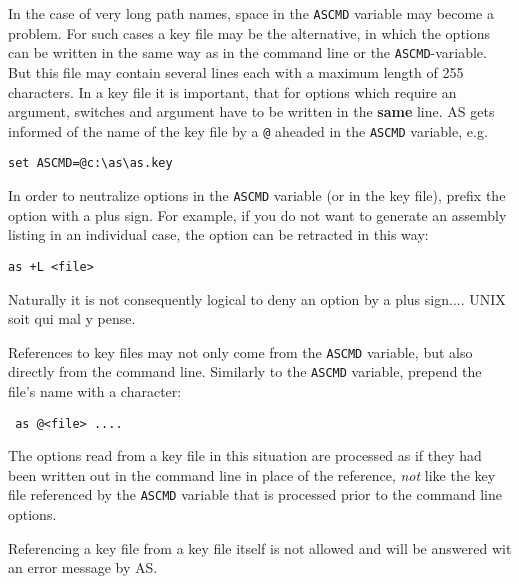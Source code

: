 \documentclass[12pt,twoside]{report}
\newcommand{\bb}[1]{{\bf #1}}
\newcommand{\tty}[1]{{\tt #1}}
\newcommand{\asname}{{AS}}
\begin{document}
In the case of very long path names, space in the \tty{ASCMD} variable may
become a problem.  For such cases a key file may be the alternative,
in which the options can be written in the same way as in the command
line or the \tty{ASCMD}-variable.  But this file may contain several lines
each with a maximum length of 255 characters.  In a key file it is
important, that for options which require an argument, switches and
argument have to be written in the \bb{same} line.  \asname{} gets informed of
the name of the key file by a \tty{@} aheaded in the \tty{ASCMD} variable,
e.g.
\begin{verbatim}
set ASCMD=@c:\as\as.key
\end{verbatim}
In order to neutralize options in the \tty{ASCMD} variable (or in the
key file), prefix the option with a plus sign.  For example, if you
do not want to generate an assembly listing in an individual case,
the option can be retracted in this way:
\begin{verbatim}
as +L <file>
\end{verbatim}
Naturally it is not consequently logical to deny an option by a
plus sign....  UNIX soit qui mal y pense.

References to key files may not only come from the {\tt ASCMD} variable,
but also directly from the command line.  Similarly to the {\tt ASCMD}
variable, prepend the file's name with a \@ character:
\begin{verbatim}
 as @<file> ....
\end{verbatim}
The options read from a key file in this situation are processed as if
they had been written out in the command line in place of the reference,
{\em not} like the key file referenced by the {\tt ASCMD} variable that is
processed prior to the command line options.

Referencing a key file from a key file itself is not allowed and will be
answered wit an error message by \asname{}.
\end{document}

